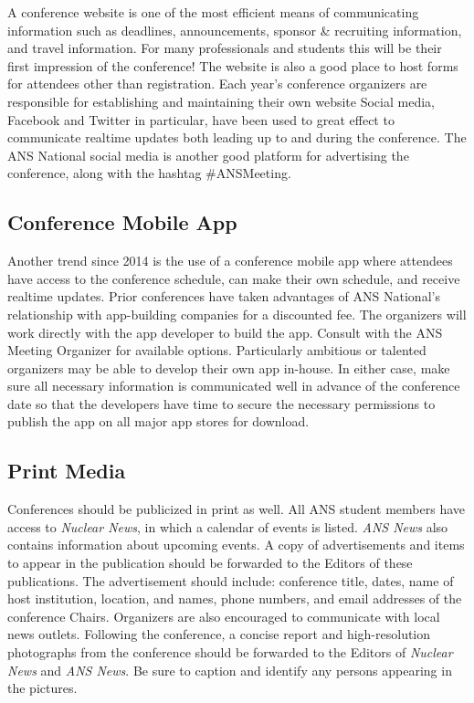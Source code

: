 \documentclass[12pt]{article}
\begin{document}
A conference website is one of the most efficient means of communicating information such as deadlines, announcements, sponsor \& recruiting information, and travel information.
For many professionals and students this will be their first impression of the conference!
The website is also a good place to host forms for attendees other than registration.
Each year's conference organizers are responsible for establishing and maintaining their own website
Social media, Facebook and Twitter in particular, have been used to great effect to communicate realtime updates both leading up to and during the conference.
The ANS National social media is another good platform for advertising the conference, along with the hashtag \#ANSMeeting.

\subsection{Conference Mobile App}
Another trend since 2014 is the use of a conference mobile app where attendees have access to the conference schedule, can make their own schedule, and receive realtime updates.
Prior conferences have taken advantages of ANS National's relationship with app-building companies for a discounted fee. 
The organizers will work directly with the app developer to build the app.
Consult with the ANS Meeting Organizer for available options.
Particularly ambitious or talented organizers may be able to develop their own app in-house.
In either case, make sure all necessary information is communicated well in advance of the conference date so that the developers have time to secure the necessary permissions to publish the app on all major app stores for download.

\subsection{Print Media}
Conferences should be publicized in print as well.
All ANS student members have access to \textit{Nuclear News}, in which a calendar of events is listed.
\textit{ANS News} also contains information about upcoming events.
A copy of advertisements and items to appear in the publication should be forwarded to the Editors of these publications.
The advertisement should include: conference title, dates, name of host institution, location, and names, phone numbers, and email addresses of the conference Chairs. 
Organizers are also encouraged to communicate with local news outlets.
Following the conference, a concise report and high-resolution photographs from the conference should be forwarded to the Editors of \textit{Nuclear News} and \textit{ANS News}.
Be sure to caption and identify any persons appearing in the pictures.
\end{document}
